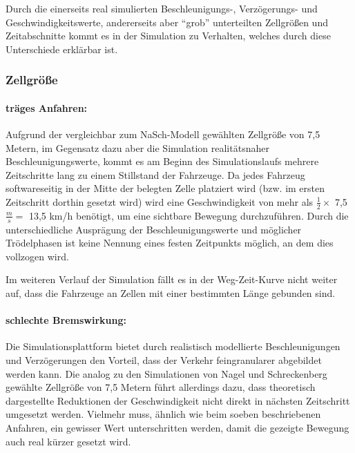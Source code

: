 Durch die einerseits real simulierten Beschleunigungs-, Verzögerungs- und Geschwindigkeitswerte, andererseits aber \enquote{grob} unterteilten Zellgrößen und Zeitabschnitte kommt es in der Simulation zu Verhalten, welches durch diese Unterschiede erklärbar ist.


\subsubsection{Zellgröße}

\paragraph{träges Anfahren:}
\label{sec:accelerategroove}

Aufgrund der vergleichbar zum NaSch-Modell gewählten Zellgröße von 7,5 Metern, im Gegensatz dazu aber die Simulation realitätsnaher Beschleunigungswerte, kommt es am Beginn des Simulationslaufs mehrere Zeitschritte lang zu einem Stillstand der Fahrzeuge.
Da jedes Fahrzeug softwareseitig in der Mitte der belegten Zelle platziert wird (bzw. im ersten Zeitschritt dorthin gesetzt wird) wird eine Geschwindigkeit von mehr als $ \frac{1}{2} \times $ 7,5 $ \frac{m}{s} = $ 13,5 km/h benötigt, um eine sichtbare Bewegung durchzuführen.
Durch die unterschiedliche Ausprägung der Beschleunigungswerte und möglicher Trödelphasen ist keine Nennung eines festen Zeitpunkts möglich, an dem dies vollzogen wird.

Im weiteren Verlauf der Simulation fällt es in der Weg-Zeit-Kurve nicht weiter auf, dass die Fahrzeuge an Zellen mit einer bestimmten Länge gebunden sind.



\paragraph{schlechte Bremswirkung:}
\label{sec:bremsverhalten}

Die Simulationsplattform bietet durch realistisch modellierte Beschleunigungen und Verzögerungen den Vorteil, dass der Verkehr feingranularer abgebildet werden kann.
Die analog zu den Simulationen von Nagel und Schreckenberg gewählte Zellgröße von 7,5 Metern führt allerdings dazu, dass theoretisch dargestellte Reduktionen der Geschwindigkeit nicht direkt in nächsten Zeitschritt umgesetzt werden.
Vielmehr muss, ähnlich wie beim soeben beschriebenen Anfahren, ein gewisser Wert unterschritten werden, damit die gezeigte Bewegung auch real kürzer gesetzt wird.


